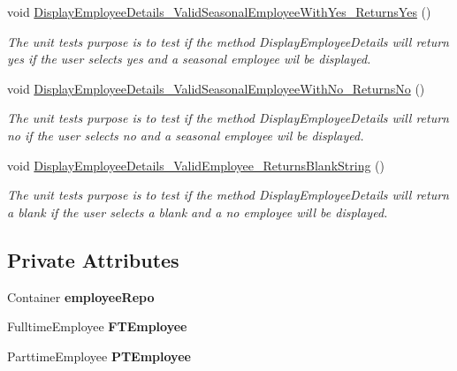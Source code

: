 \begin{DoxyCompactItemize}
void \hyperlink{class_the_company_1_1_tests_1_1_select_employee_tests_a66fd04b6b8a886ac689e940dacd4c933}{Display\+Employee\+Details\+\_\+\+Valid\+Seasonal\+Employee\+With\+Yes\+\_\+\+Returns\+Yes} ()
\begin{DoxyCompactList}\small\item\em The unit test\textquotesingle{}s purpose is to test if the method Display\+Employee\+Details will return yes if the user selects yes and a seasonal employee wil be displayed. \end{DoxyCompactList}\item 
void \hyperlink{class_the_company_1_1_tests_1_1_select_employee_tests_af444eebfcb96fadc14b01e0f32ae77ea}{Display\+Employee\+Details\+\_\+\+Valid\+Seasonal\+Employee\+With\+No\+\_\+\+Returns\+No} ()
\begin{DoxyCompactList}\small\item\em The unit test\textquotesingle{}s purpose is to test if the method Display\+Employee\+Details will return no if the user selects no and a seasonal employee wil be displayed. \end{DoxyCompactList}\item 
void \hyperlink{class_the_company_1_1_tests_1_1_select_employee_tests_aed995750b42fab5ca2d7911045a53af3}{Display\+Employee\+Details\+\_\+\+Valid\+Employee\+\_\+\+Returns\+Blank\+String} ()
\begin{DoxyCompactList}\small\item\em The unit test\textquotesingle{}s purpose is to test if the method Display\+Employee\+Details will return a blank if the user selects a blank and a no employee will be displayed. \end{DoxyCompactList}\end{DoxyCompactItemize}
\subsection*{Private Attributes}
\begin{DoxyCompactItemize}
\item 
\hypertarget{class_the_company_1_1_tests_1_1_select_employee_tests_a1c3351dd9b04a7b3a7eb61e084739a61}{}Container {\bfseries employee\+Repo}\label{class_the_company_1_1_tests_1_1_select_employee_tests_a1c3351dd9b04a7b3a7eb61e084739a61}

\item 
\hypertarget{class_the_company_1_1_tests_1_1_select_employee_tests_a4569271e9efd81e7ff81d6d20d2af932}{}Fulltime\+Employee {\bfseries F\+T\+Employee}\label{class_the_company_1_1_tests_1_1_select_employee_tests_a4569271e9efd81e7ff81d6d20d2af932}

\item 
\hypertarget{class_the_company_1_1_tests_1_1_select_employee_tests_aca371fc7afd6d27c0af616a093033425}{}Parttime\+Employee {\bfseries P\+T\+Employee}\label{class_the_company_1_1_tests_1_1_select_employee_tests_aca371fc7afd6d27c0af616a093033425}

\end{DoxyCompactItemize}


